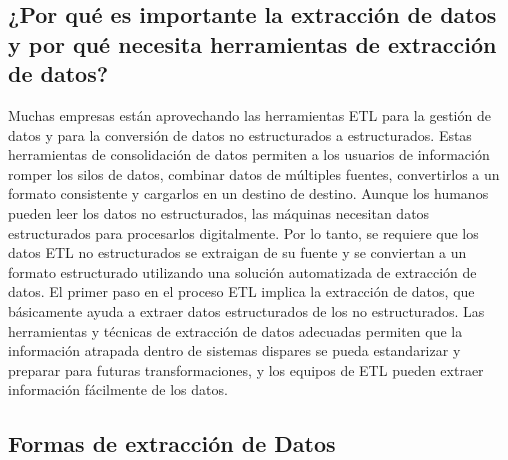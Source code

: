 \documentclass[twoside,twocolumn]{article}
\begin{document}
\subsection{¿Por qué es importante la extracción de datos y por qué necesita herramientas de extracción de datos?}
Muchas empresas están aprovechando las herramientas ETL para la gestión de datos y para la conversión de datos no estructurados a estructurados. Estas herramientas de consolidación de datos permiten a los usuarios de información romper los silos de datos, combinar datos de múltiples fuentes, convertirlos a un formato consistente y cargarlos en un destino de destino. Aunque los humanos pueden leer los datos no estructurados, las máquinas necesitan datos estructurados para procesarlos digitalmente. Por lo tanto, se requiere que los datos ETL no estructurados se extraigan de su fuente y se conviertan a un formato estructurado utilizando una solución automatizada de extracción de datos. El primer paso en el proceso ETL implica la extracción de datos, que básicamente ayuda a extraer datos estructurados de los no estructurados. Las herramientas y técnicas de extracción de datos adecuadas permiten que la información atrapada dentro de sistemas dispares se pueda estandarizar y preparar para futuras transformaciones, y los equipos de ETL pueden extraer información fácilmente de los datos.

\subsection{Formas de extracción de Datos}
\end{document}
